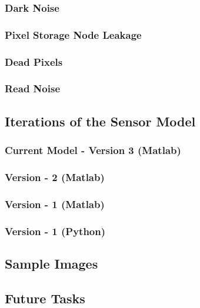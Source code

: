 \subsubsection{Dark Noise} %
\blindtext

\subsubsection{Pixel Storage Node Leakage} %
\blindtext

\subsubsection{Dead Pixels} %
\blindtext

\subsubsection{Read Noise} %
\blindtext




\subsection{Iterations of the Sensor Model}
\blindtext

\subsubsection{Current Model - Version 3 (Matlab)}
\blindtext

\subsubsection{Version - 2 (Matlab)}
\blindtext

\subsubsection{Version - 1 (Matlab)}
\blindtext

\subsubsection{Version - 1 (Python)}
\blindtext




\subsection{Sample Images}
\blindtext



\subsection{Future Tasks}
\blindtext